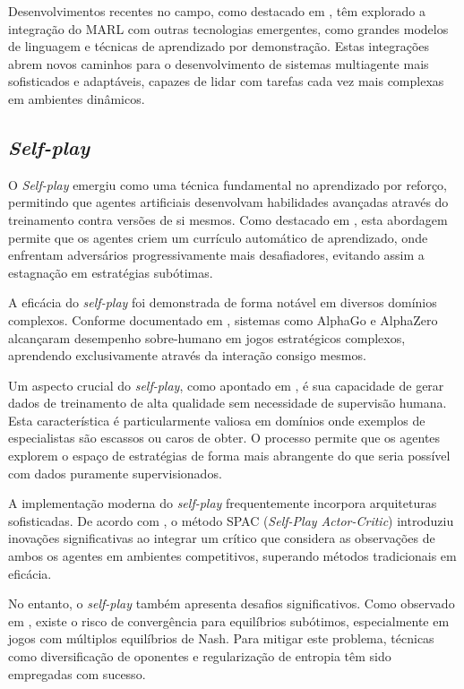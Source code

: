 Desenvolvimentos recentes no campo, como destacado em \cite{survey_multi_agent}, têm explorado a integração do MARL com outras tecnologias emergentes, como grandes modelos de linguagem e técnicas de aprendizado por demonstração. Estas integrações abrem novos caminhos para o desenvolvimento de sistemas multiagente mais sofisticados e adaptáveis, capazes de lidar com tarefas cada vez mais complexas em ambientes dinâmicos.

\subsection{\textit{Self-play}}
\label{subsec:self_play}

O \textit{Self-play} emergiu como uma técnica fundamental no aprendizado por reforço, permitindo que agentes artificiais desenvolvam habilidades avançadas através do treinamento contra versões de si mesmos. Como destacado em \cite{survey_self_play}, esta abordagem permite que os agentes criem um currículo automático de aprendizado, onde enfrentam adversários progressivamente mais desafiadores, evitando assim a estagnação em estratégias subótimas.

A eficácia do \textit{self-play} foi demonstrada de forma notável em diversos domínios complexos. Conforme documentado em \cite{alpha_zero}, sistemas como AlphaGo e AlphaZero alcançaram desempenho sobre-humano em jogos estratégicos complexos, aprendendo exclusivamente através da interação consigo mesmos.

Um aspecto crucial do \textit{self-play}, como apontado em \cite{survey_self_play_2024}, é sua capacidade de gerar dados de treinamento de alta qualidade sem necessidade de supervisão humana. Esta característica é particularmente valiosa em domínios onde exemplos de especialistas são escassos ou caros de obter. O processo permite que os agentes explorem o espaço de estratégias de forma mais abrangente do que seria possível com dados puramente supervisionados.

A implementação moderna do \textit{self-play} frequentemente incorpora arquiteturas sofisticadas. De acordo com \cite{self_play_adversarial_critic}, o método SPAC (\textit{Self-Play Actor-Critic}) introduziu inovações significativas ao integrar um crítico que considera as observações de ambos os agentes em ambientes competitivos, superando métodos tradicionais em eficácia.

No entanto, o \textit{self-play} também apresenta desafios significativos. Como observado em \cite{provable_self_play}, existe o risco de convergência para equilíbrios subótimos, especialmente em jogos com múltiplos equilíbrios de Nash. Para mitigar este problema, técnicas como diversificação de oponentes e regularização de entropia têm sido empregadas com sucesso.

